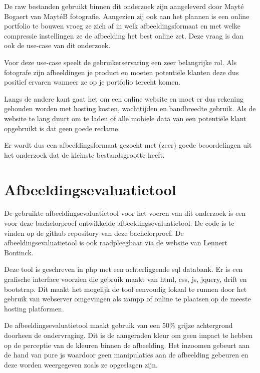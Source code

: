 De \gls{raw} bestanden gebruikt binnen dit onderzoek zijn aangeleverd door Mayté Bogaert van MaytéB fotografie. Aangezien zij ook aan het plannen is een online portfolio te bouwen vroeg ze zich af in welk \gls{afbeeldingsformaat} en met welke compressie instellingen ze de afbeelding het best online zet. Deze vraag is dan ook de \gls{use-case} van dit onderzoek.

Voor deze \gls{use-case} speelt de gebruikerservaring een zeer belangrijke rol. Als fotografe zijn afbeeldingen je product en moeten potentiële klanten deze dus positief ervaren wanneer ze op je portfolio terecht komen.

Langs de andere kant gaat het om een online website en moet er dus rekening gehouden worden met \gls{hosting} kosten, wachttijden en \gls{bandbreedte} gebruik. Als de website te lang duurt om te laden of alle mobiele data van een potentiële klant opgebruikt is dat geen goede reclame.

Er wordt dus een \gls{afbeeldingsformaat} gezocht met (zeer) goede beoordelingen uit het onderzoek dat de kleinste bestandsgrootte heeft.

\section{Afbeeldingsevaluatietool}
\label{sec:onderzoek-evaluatietool}

De gebruikte \gls{afbeeldingsevaluatietool} voor het voeren van dit onderzoek is een voor deze bachelorproef ontwikkelde \gls{afbeeldingsevaluatietool}. De code is te vinden op de \gls{github} repository van deze bachelorproef. De \gls{afbeeldingsevaluatietool} is ook raadpleegbaar via de website van Lennert Bontinck.

Deze tool is geschreven in \gls{php} met een achterliggende \gls{sql} databank. Er is een grafische interface voorzien die gebruik maakt van \gls{html}, \gls{css}, \gls{js}, \gls{jquery}, \gls{drift} en \gls{bootstrap}. Dit maakt het mogelijk de tool eenvoudig lokaal te runnen door het gebruik van webserver omgevingen als \gls{xampp} of online te plaatsen op de meeste \gls{hosting} platformen.

De \gls{afbeeldingsevaluatietool} maakt gebruik van een 50\% grijze achtergrond doorheen de ondervraging. Dit is de aangeraden kleur om geen impact te hebben op de perceptie van de kleuren binnen de afbeelding. Het inzoomen gebeurt aan de hand van pure \gls{js} waardoor geen manipulaties aan de afbeelding gebeuren en deze worden weergegeven zoals ze opgeslagen zijn. 

